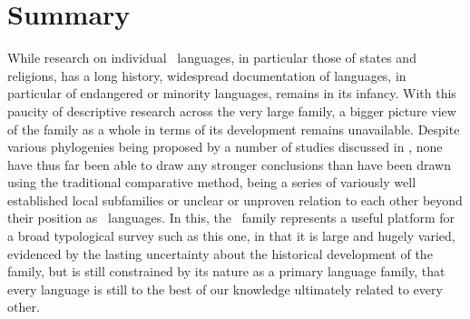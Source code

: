 \section{Summary}
While research on individual \lfam\ languages, in particular those of states and religions, has a long history, widespread documentation of languages, in particular of endangered or minority languages, remains in its infancy. With this paucity of descriptive research across the very large family, a bigger picture view of the family as a whole in terms of its development remains unavailable. Despite various phylogenies being proposed by a number of studies discussed in , none have thus far been able to draw any stronger conclusions than have been drawn using the traditional comparative method, being a series of variously well established local subfamilies or unclear or unproven relation to each other beyond their position as \lfam\ languages. In this, the \lfam\ family represents a useful platform for a broad typological survey such as this one, in that it is large and hugely varied, evidenced by the lasting uncertainty about the historical development of the family, but is still constrained by its nature as a primary language family, that every language is still to the best of our knowledge ultimately related to every other.